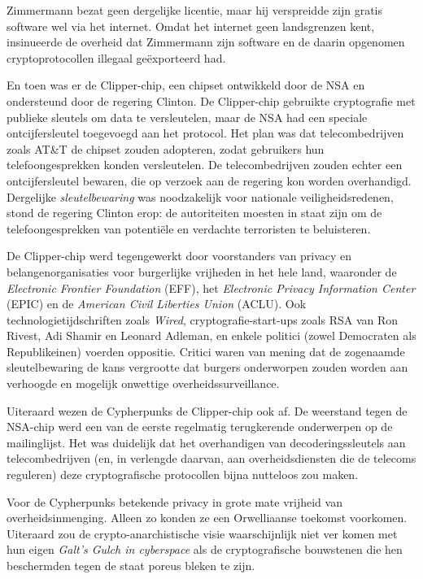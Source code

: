 \documentclass[
  a5paper,
  smalldemyvopaper,11pt,twoside,onecolumn,openright,extrafontsizes,
hidelinks]{memoir}
\begin{document}
Zimmermann bezat geen dergelijke licentie, maar hij verspreidde zijn
gratis software wel via het internet. Omdat het internet geen
landsgrenzen kent, insinueerde de overheid dat Zimmermann zijn software
en de daarin opgenomen cryptoprotocollen illegaal geëxporteerd had.

En toen was er de Clipper-chip, een chipset ontwikkeld door de NSA en
ondersteund door de regering Clinton. De Clipper-chip gebruikte
cryptografie met publieke sleutels om data te versleutelen, maar de NSA
had een speciale ontcijfersleutel toegevoegd aan het protocol. Het plan
was dat telecombedrijven zoals AT\&T de chipset zouden adopteren, zodat
gebruikers hun telefoongesprekken konden versleutelen. De
telecombedrijven zouden echter een ontcijfersleutel bewaren, die op
verzoek aan de regering kon worden overhandigd. Dergelijke
\emph{sleutelbewaring} was noodzakelijk voor nationale
veiligheidsredenen, stond de regering Clinton erop: de autoriteiten
moesten in staat zijn om de telefoongesprekken van potentiële en
verdachte terroristen te beluisteren.

De Clipper-chip werd tegengewerkt door voorstanders van privacy en
belangenorganisaties voor burgerlijke vrijheden in het hele land,
waaronder de \emph{Electronic Frontier Foundation} (EFF), het
\emph{Electronic Privacy Information Center} (EPIC) en de \emph{American
Civil Liberties Union} (ACLU). Ook technologietijdschriften zoals
\emph{Wired}, cryptografie-start-ups zoals RSA van Ron Rivest, Adi
Shamir en Leonard Adleman, en enkele politici (zowel Democraten als
Republikeinen) voerden oppositie. Critici waren van mening dat de
zogenaamde sleutelbewaring de kans vergrootte dat burgers onderworpen
zouden worden aan verhoogde en mogelijk onwettige overheidssurveillance.

Uiteraard wezen de Cypherpunks de Clipper-chip ook af. De weerstand
tegen de NSA-chip werd een van de eerste regelmatig terugkerende
onderwerpen op de mailinglijst. Het was duidelijk dat het overhandigen
van decoderingssleutels aan telecombedrijven (en, in verlengde daarvan,
aan overheidsdiensten die de telecoms reguleren) deze cryptografische
protocollen bijna nutteloos zou maken.

Voor de Cypherpunks betekende privacy in grote mate vrijheid van
overheidsinmenging. Alleen zo konden ze een Orwelliaanse toekomst
voorkomen. Uiteraard zou de crypto-anarchistische visie waarschijnlijk
niet ver komen met hun eigen \emph{Galt's Gulch in cyberspace} als de
cryptografische bouwstenen die hen beschermden tegen de staat poreus
bleken te zijn.
\end{document}
